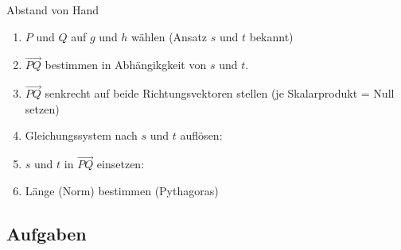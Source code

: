 \newpage
\begin{rezept}{Abstand von Hand}{}
  \begin{enumerate}
  \item $P$ und $Q$ auf $g$ und $h$ wählen (Ansatz $s$ und $t$ bekannt)
  \item $\overrightarrow{PQ}$ bestimmen in Abhängikgkeit von $s$ und $t$.
  \item $\overrightarrow{PQ}$  senkrecht auf beide Richtungsvektoren
  stellen (je Skalarprodukt = Null setzen)
  \item Gleichungssystem nach $s$ und $t$ auflösen:
  \item $s$ und $t$ in  $\overrightarrow{PQ}$  einsetzen:
  \item Länge (Norm) bestimmen (Pythagoras)
  \end{enumerate}
\end{rezept}

\newpage

\subsection*{Aufgaben}



